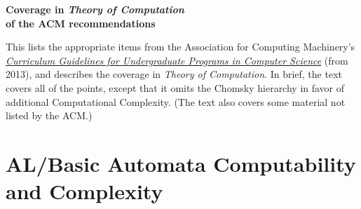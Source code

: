 \documentclass[11pt]{article}
\begin{document}
\thispagestyle{empty}
\begin{center}\Large\bfseries
  Coverage in \textit{Theory of Computation} \\
  of the ACM recommendations 
\end{center}

This lists the appropriate items from the Association for Computing Machinery's
\href{https://www.acm.org/binaries/content/assets/education/cs2013_web_final.pdf}{\textit{Curriculum Guidelines for Undergraduate Programs in Computer Science}}
(from 2013), and describes the coverage in \textit{Theory of Computation}.
In brief, the text covers all of the points, except that it
omits the Chomsky hierarchy in favor of additional Computational
Complexity.
(The text also covers some material not listed by the ACM.)



\section{AL/Basic Automata Computability and Complexity}
\end{document}
